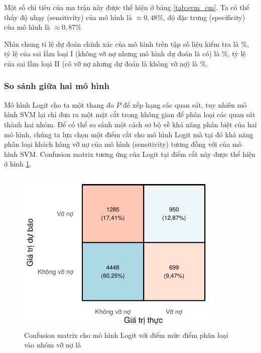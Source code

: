 \documentclass[a4paper]{report}\usepackage[]{graphicx}\usepackage[]{color}
\newenvironment{knitrout}{}{} %
\begin{document}
Một số chỉ tiêu của ma trận này được thể hiện ở bảng \ref{tab:svm_cm}. Ta có thể thấy độ nhạy (sensitivity) của mô hình là $\approx 0,48 \%$, độ đặc trưng (specificity) của mô hình là $\approx 0,87 \%$


Nhìn chung tỉ lệ dự đoán chính xác của mô hình trên tập số liệu kiểm tra là \%, tỷ lệ của sai lầm loại I (không vỡ nợ nhưng mô hình dự đoán là có) là \%, tỷ lệ của sai lầm loại II (có vỡ nợ nhưng dự đoán là không vỡ nợ) là \%.



\subsubsection{So sánh giữa hai mô hình}

Mô hình Logit cho ta một thang đo $P$ để xếp hạng các quan sát, tuy nhiên mô hình SVM lại chỉ đưa ra một mặt cắt trong không gian để phân loại các quan sát thành hai nhóm. Để có thể so sánh một cách sơ bộ về khả năng phân biệt của hai mô hình, chúng ta lựa chọn một điểm cắt cho mô hình Logit mà tại đó khả năng phân loại khách hàng vỡ nợ của mô hình (sensitivity) tương đồng với của mô hình SVM. Confusion matrix tương ứng của Logit tại điểm cắt này được thể hiện ở hình \ref{fig:lasso_confusion_mat}.




\begin{figure}[h]
\centering
\capstart
\begin{knitrout}\small
{}\color{fgcolor}
\includegraphics[width=10cm]{Figures/lasso_confusion_mat-1} 

\end{knitrout}
\caption{Confusion matrix cho mô hình Logit với điểm mức điểm phân loại vào nhóm vỡ nợ là }
\label{fig:lasso_confusion_mat}
\end{figure}
\end{document}
